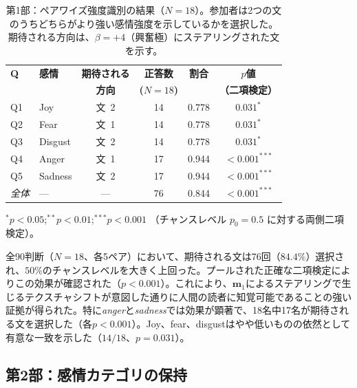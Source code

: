 \begin{table}[H]
\centering
\small
\begin{threeparttable}
\begin{tabular}{llcccc}
\toprule
\textbf{Q} & \textbf{感情} & \textbf{期待される} & \textbf{正答数} & \textbf{割合} & \textbf{$p$値} \\
 & & \textbf{方向} & \textbf{($N=18$)} & & \textbf{（二項検定）} \\
\midrule
Q1 & Joy     & 文~2 & 14 & 0.778 & $0.031^{*}$ \\
Q2 & Fear    & 文~1 & 14 & 0.778 & $0.031^{*}$ \\
Q3 & Disgust & 文~2 & 14 & 0.778 & $0.031^{*}$ \\
Q4 & Anger   & 文~1 & 17 & 0.944 & $<0.001^{***}$ \\
Q5 & Sadness & 文~2 & 17 & 0.944 & $<0.001^{***}$ \\
\midrule
\textit{全体} & --- & --- & 76 & 0.844 & $<0.001^{***}$ \\
\bottomrule
\end{tabular}
\begin{tablenotes}
\small
\item $^{*}p < 0.05$;\quad $^{**}p < 0.01$;\quad $^{***}p < 0.001$ （チャンスレベル $p_0 = 0.5$ に対する両側二項検定）。
\end{tablenotes}
\end{threeparttable}
\caption{第1部：ペアワイズ強度識別の結果（$N = 18$）。参加者は2つの文のうちどちらがより強い感情強度を示しているかを選択した。期待される方向は、$\beta=+4$（興奮極）にステアリングされた文を示す。}
\label{tab:human_eval_p1}
\end{table}

全90判断（$N=18$、各5ペア）において、期待される文は76回（$84.4\%$）選択され、$50\%$のチャンスレベルを大きく上回った。プールされた正確な二項検定によりこの効果が確認された（$p < 0.001$）。これにより、$\mathbf{m}_1$によるステアリングで生じるテクスチャシフトが意図した通りに人間の読者に知覚可能であることの強い証拠が得られた。特に\textit{anger}と\textit{sadness}では効果が顕著で、18名中17名が期待される文を選択した（各$p < 0.001$）。Joy、fear、disgustはやや低いものの依然として有意な一致を示した（$14/18$、$p = 0.031$）。\par

\subsection{第2部：感情カテゴリの保持}

